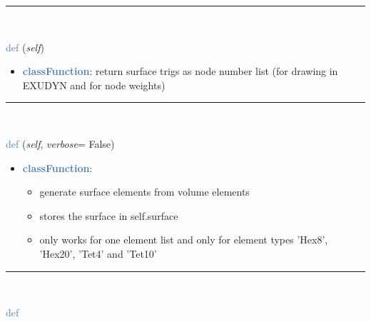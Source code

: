 \begin{itemize}[leftmargin=1.4cm]
\begin{itemize}[leftmargin=1.4cm]
\begin{itemize}[leftmargin=1.4cm]
\begin{itemize}[leftmargin=0.5cm]
\begin{itemize}[leftmargin=1.4cm]
\begin{itemize}[leftmargin=1.4cm]
\begin{itemize}[leftmargin=1.4cm]
\begin{itemize}[leftmargin=0.5cm]
\begin{itemize}[leftmargin=0.7cm]
\vspace{12pt}\end{itemize}
%
\noindent\rule{8cm}{0.75pt}\vspace{1pt} \\ 
\begin{flushleft}
\noindent \textcolor{steelblue}{def {\bf {}}}\label{sec:FEM:FEMinterface:GetSurfaceTriangles}
({\it self})
\end{flushleft}
\setlength{\itemindent}{0.7cm}
\begin{itemize}[leftmargin=0.7cm]
\item[--]\textcolor{steelblue}{\bf classFunction}: return surface trigs as node number list (for drawing in EXUDYN and for node weights)
\vspace{12pt}\end{itemize}
%
\noindent\rule{8cm}{0.75pt}\vspace{1pt} \\ 
\begin{flushleft}
\noindent \textcolor{steelblue}{def {\bf {}}}\label{sec:FEM:FEMinterface:VolumeToSurfaceElements}
({\it self}, {\it verbose}= False)
\end{flushleft}
\setlength{\itemindent}{0.7cm}
\begin{itemize}[leftmargin=0.7cm]
\item[--]\textcolor{steelblue}{\bf classFunction}: \vspace{-6pt}
\begin{itemize}[leftmargin=1.2cm]
\setlength{\itemindent}{-0.7cm}
\item[]generate surface elements from volume elements
\item[]stores the surface in self.surface
\item[]only works for one element list and only for element types 'Hex8', 'Hex20', 'Tet4' and 'Tet10'
\end{itemize}
\vspace{12pt}\end{itemize}
%
\noindent\rule{8cm}{0.75pt}\vspace{1pt} \\ 
\begin{flushleft}
\noindent \textcolor{steelblue}{def {\bf {}}}\label{sec:FEM:FEMinterface:GetRigidBodyInertia}

\end{flushleft}
\end{itemize}
\end{itemize}
\end{itemize}
\end{itemize}
\end{itemize}
\end{itemize}
\end{itemize}
\end{itemize}
